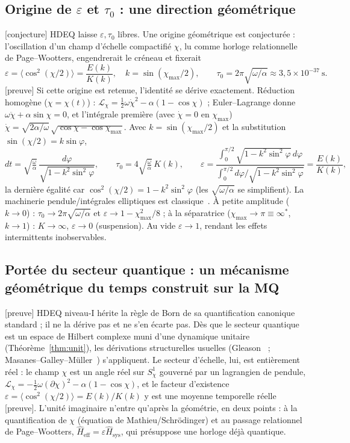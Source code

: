 \documentclass[11pt,a4paper]{article}
\newcommand{\statut}[1]{{\footnotesize\textsf{[#1]}}}
\theoremstyle{plain}
\theoremstyle{definition}
\theoremstyle{remark}
\begin{document}
\subsection{Origine de $\varepsilon$ et $\tau_0$ : une direction g\'eom\'etrique}\label{sec:origine}
\statut{conjecture} HDEQ laisse $\varepsilon,\tau_0$ libres. Une origine g\'eom\'etrique
est conjectur\'ee : l'oscillation d'un champ d'\'echelle compactifi\'e $\chi$, lu comme
horloge relationnelle de Page--Wootters, engendrerait le cr\'eneau et fixerait
\[
\varepsilon=\langle\cos^2(\chi/2)\rangle=\frac{E(k)}{K(k)},\quad
k=\sin(\chi_{\max}/2),\qquad
\tau_0=2\pi\sqrt{\omega/\alpha}\approx3{,}5\times10^{-37}\ \mathrm{s}.
\]
\statut{preuve} Si cette origine est retenue, l'identit\'e se d\'erive exactement. R\'eduction homog\`ene ($\chi=\chi(t)$) : $\mathcal L_\chi=\tfrac12\omega\dot\chi^2-\alpha(1-\cos\chi)$ ; Euler--Lagrange donne $\omega\ddot\chi+\alpha\sin\chi=0$, et l'int\'egrale premi\`ere (avec $\dot\chi=0$ en $\chi_{\max}$) $\dot\chi=\sqrt{2\alpha/\omega}\,\sqrt{\cos\chi-\cos\chi_{\max}}$. Avec $k=\sin(\chi_{\max}/2)$ et la substitution $\sin(\chi/2)=k\sin\varphi$,
\[
dt=\sqrt{\tfrac{\omega}{\alpha}}\,\frac{d\varphi}{\sqrt{1-k^2\sin^2\varphi}},\qquad
\tau_0=4\sqrt{\tfrac{\omega}{\alpha}}\,K(k),\qquad
\varepsilon=\frac{\int_0^{\pi/2}\!\sqrt{1-k^2\sin^2\varphi}\,d\varphi}{\int_0^{\pi/2}\!d\varphi/\sqrt{1-k^2\sin^2\varphi}}=\frac{E(k)}{K(k)},
\]
la derni\`ere \'egalit\'e car $\cos^2(\chi/2)=1-k^2\sin^2\varphi$ (les $\sqrt{\omega/\alpha}$ se simplifient). La machinerie pendule/int\'egrales elliptiques est classique~\cite{Landau}. \`A petite amplitude ($k\to0$) : $\tau_0\to2\pi\sqrt{\omega/\alpha}$ et $\varepsilon\to1-\chi_{\max}^2/8$ ; \`a la s\'eparatrice ($\chi_{\max}\to\pi\equiv\infty^*$, $k\to1$) : $K\to\infty$, $\varepsilon\to0$ (suspension).
Au vide $\varepsilon\to1$, rendant les effets intermittents inobservables.

\subsection{Port\'ee du secteur quantique : un m\'ecanisme g\'eom\'etrique du temps construit sur la MQ}\label{sec:portee-q}
\statut{preuve} HDEQ niveau-I h\'erite la r\`egle de Born de sa quantification canonique standard ; il ne la d\'erive pas et ne s'en \'ecarte pas. D\`es que le secteur quantique est un espace de Hilbert complexe muni d'une dynamique unitaire (Th\'eor\`eme~\ref{thm:unit}), les d\'erivations structurelles usuelles (Gleason~\cite{Gleason} ; Masanes--Galley--M\"uller~\cite{MGM}) s'appliquent. Le secteur d'\'echelle, lui, est enti\`erement r\'eel : le champ $\chi$ est un angle r\'eel sur $S^1_\chi$ gouvern\'e par un lagrangien de pendule, $\mathcal{L}_\chi=-\tfrac12\omega(\partial\chi)^2-\alpha(1-\cos\chi)$, et le facteur d'existence $\varepsilon=\langle\cos^2(\chi/2)\rangle=E(k)/K(k)$ y est une moyenne temporelle r\'eelle \statut{preuve}. L'unit\'e imaginaire n'entre qu'apr\`es la g\'eom\'etrie, en deux points : \`a la quantification de $\chi$ (\'equation de Mathieu/Schr\"odinger) et au passage relationnel de Page--Wootters, $\hat H_{\mathrm{eff}}=\varepsilon\hat H_{\mathrm{sys}}$, qui pr\'esuppose une horloge d\'ej\`a quantique.
\end{document}
